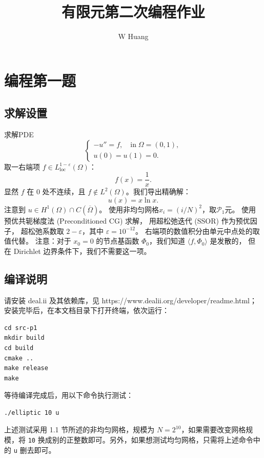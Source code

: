 \documentclass[lang=cn,11pt,a4paper]{elegantpaper}
\title{有限元第二次编程作业}
\author{W Huang}
\date{\zhtoday}
\begin{document}
\maketitle

\section{编程第一题}

\subsection{求解设置}

求解PDE
\begin{equation}
    \left\{
        \begin{array}{l}
            -u'' = f,\quad \text{in}\;\Omega=(0,1),\\
            u(0) = u(1) = 0.
        \end{array}
    \right.
\end{equation}
取一右端项 $f\in L_\text{loc}^{1-\varepsilon}(\Omega)$：
\begin{equation}
    f(x)=\frac{1}{x}.
\end{equation}
显然 $f$ 在 $0$ 处不连续，且 $f\notin L^2(\Omega)$。我们导出精确解：
\begin{equation}
    u(x)=x\ln x.
\end{equation}
注意到 $u\in H^1(\Omega)\cap C(\overline{\Omega})$。
使用非均匀网格$x_i=(i/N)^2$，取$\mathcal{P}_1$元。
使用预优共轭梯度法 (Preconditioned CG) 求解，
用超松弛迭代 (SSOR) 作为预优因子，
超松弛系数取 $2-\varepsilon$，其中 $\varepsilon=10^{-12}$。
右端项的数值积分由单元中点处的取值代替。
注意：对于 $x_0=0$ 的节点基函数 $\Phi_0$，我们知道
$\langle f, \Phi_0 \rangle$ 是发散的，
但在 Dirichlet 边界条件下，我们不需要这一项。

\subsection{编译说明}

请安装 deal.ii 及其依赖库，见 https://www.dealii.org/developer/readme.html；安装完毕后，在本文档目录下打开终端，依次运行：
\begin{lstlisting}
cd src-p1
mkdir build
cd build
cmake ..
make release
make
\end{lstlisting}
等待编译完成后，用以下命令执行测试：
\begin{lstlisting}
./elliptic 10 u
\end{lstlisting}
上述测试采用 1.1 节所述的非均匀网格，规模为 $N=2^{10}$，如果需要改变网格规模，将 \verb|10| 换成别的正整数即可。另外，如果想测试均匀网格，只需将上述命令中的 \verb|u| 删去即可。
\end{document}
